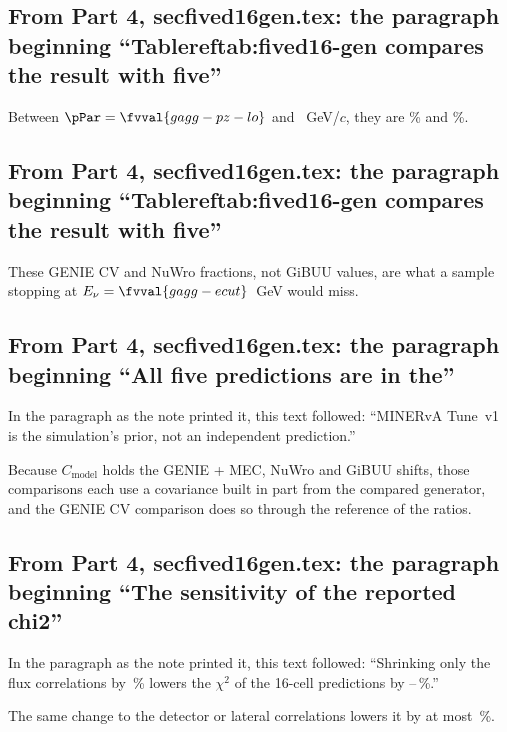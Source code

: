 \subsection{From Part 4, secfived16gen.tex: the paragraph beginning ``Tablereftab:fived16-gen compares the result with five''}
Between $\pPar=\fvval{gagg-pz-lo}$ and ~GeV/$c$, they are \% and \%.

\subsection{From Part 4, secfived16gen.tex: the paragraph beginning ``Tablereftab:fived16-gen compares the result with five''}
These GENIE CV and NuWro fractions, not GiBUU values, are what a sample stopping at $E_\nu=\fvval{gagg-ecut}$~GeV would miss.

\subsection{From Part 4, secfived16gen.tex: the paragraph beginning ``All five predictions are in the''}
In the paragraph as the note printed it, this text followed: ``MINERvA Tune~v1 is the simulation's prior, not an independent prediction.''\par
Because $C_{\mathrm{model}}$ holds the GENIE + MEC, NuWro and GiBUU shifts, those comparisons each use a covariance built in part from the compared generator, and the GENIE CV comparison does so through the reference of the ratios.

\subsection{From Part 4, secfived16gen.tex: the paragraph beginning ``The sensitivity of the reported chi2''}
In the paragraph as the note printed it, this text followed: ``Shrinking only the flux correlations by \,\% lowers the $\chi^2$ of the 16-cell predictions by --\,\%.''\par
The same change to the detector or lateral correlations lowers it by at most \,\%.

